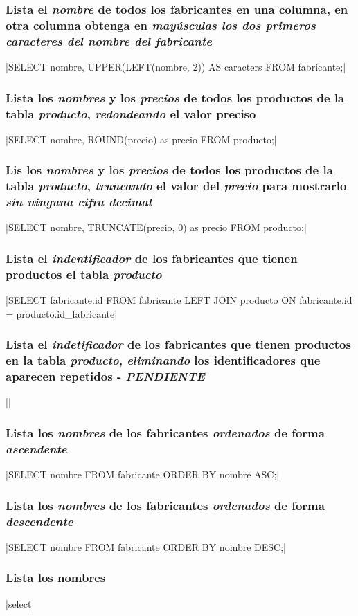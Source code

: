 \documentclass[12pt, letterpaper]{article}
\begin{document}
  \subsubsection{Lista el \textit{\textbf{nombre}} de todos los fabricantes en una columna, en otra columna obtenga en \textit{\textbf{mayúsculas los dos primeros caracteres del nombre del fabricante}}}
   |SELECT nombre, UPPER(LEFT(nombre, 2)) AS caracters FROM fabricante;|

  \subsubsection{Lista los \textit{\textbf{nombres}} y los \textit{\textbf{precios}} de todos los productos de la tabla \textit{\textbf{producto}}, \textit{\textbf{redondeando}} el valor preciso}
   |SELECT nombre, ROUND(precio) as precio FROM producto;|

  \subsubsection{Lis los \textit{\textbf{nombres}} y los \textit{\textbf{precios}} de todos los productos de la tabla \textit{\textbf{producto}}, \textit{\textbf{truncando}} el valor del \textit{\textbf{precio}} para mostrarlo \textit{\textbf{sin ninguna cifra decimal}}}
   |SELECT nombre, TRUNCATE(precio, 0) as precio FROM producto;|

  \subsubsection{Lista el \textit{\textbf{indentificador}} de los fabricantes que tienen productos el tabla \textit{\textbf{producto}}}
   |SELECT fabricante.id FROM fabricante LEFT JOIN producto ON fabricante.id = producto.id_fabricante|
  
  \subsubsection{Lista el \textit{\textbf{indetificador}} de los fabricantes que tienen productos en la tabla \textit{\textbf{producto}}, \textit{\textbf{eliminando}} los identificadores que aparecen repetidos - \textit{\textbf{PENDIENTE}} }
   ||

  \subsubsection{Lista los \textit{\textbf{nombres}} de los fabricantes \textit{\textbf{ordenados}} de forma \textit{\textbf{ascendente}}}
   |SELECT nombre FROM fabricante ORDER BY nombre ASC;|

  \subsubsection{Lista los \textit{\textbf{nombres}} de los fabricantes \textit{\textbf{ordenados}} de forma \textit{\textbf{descendente}}}
   |SELECT nombre FROM fabricante ORDER BY nombre DESC;|

  \subsubsection{Lista los nombres}
   |select|
\end{document}
